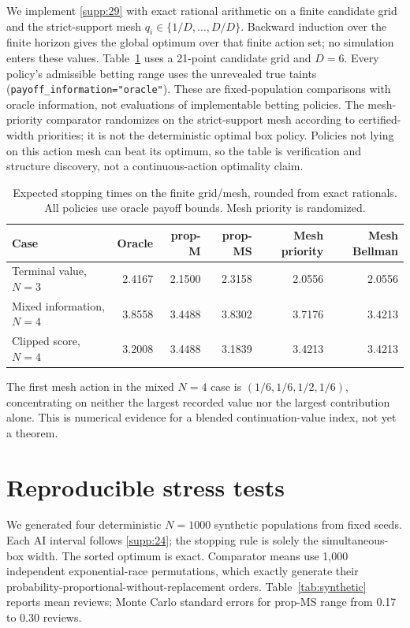 \documentclass[11pt]{article}
\begin{document}
We implement \eqref{supp:29} with exact rational arithmetic on a finite candidate grid
and the strict-support mesh \(q_i\in\{1/D,\ldots,D/D\}\). Backward induction
over the finite horizon gives the global optimum over that finite action set;
no simulation enters these values. Table~\ref{tab:small} uses a 21-point
candidate grid and \(D=6\). Every policy's admissible betting range uses the
unrevealed true taints (\texttt{payoff\_information="oracle"}). These are
fixed-population comparisons with oracle information, not evaluations of
implementable betting policies. The mesh-priority comparator randomizes on
the strict-support mesh according to certified-width priorities; it is not
the deterministic optimal box policy. Policies not lying on this action mesh can beat its
optimum, so the table is verification and structure discovery, not a
continuous-action optimality claim.

\begin{table}[t]
\centering
\small
\caption{Expected stopping times on the finite grid/mesh, rounded from exact
rationals. All policies use oracle payoff bounds. Mesh priority is randomized.}
\label{tab:small}
\begin{tabular}{lrrrrr}
\toprule
Case & Oracle & prop-M & prop-MS & Mesh priority & Mesh Bellman\\
\midrule
Terminal value, \(N=3\) & 2.4167 & 2.1500 & 2.3158 & 2.0556 & 2.0556\\
Mixed information, \(N=4\) & 3.8558 & 3.4488 & 3.8302 & 3.7176 & 3.4213\\
Clipped score, \(N=4\) & 3.2008 & 3.4488 & 3.1839 & 3.4213 & 3.4213\\
\bottomrule
\end{tabular}
\end{table}

The first mesh action in the mixed \(N=4\) case is
\((1/6,1/6,1/2,1/6)\), concentrating on neither the largest recorded value nor
the largest contribution alone. This is numerical evidence for a blended
continuation-value index, not yet a theorem.

\section{Reproducible stress tests}

We generated four deterministic \(N=1000\) synthetic populations from fixed
seeds. Each AI interval follows \eqref{supp:24}; the stopping rule is solely the
simultaneous-box width. The sorted optimum is exact. Comparator means use
1,000 independent exponential-race permutations, which exactly generate their
probability-proportional-without-replacement orders. Table~\ref{tab:synthetic}
reports mean reviews; Monte Carlo standard errors for prop-MS range from 0.17
to 0.30 reviews.
\end{document}

